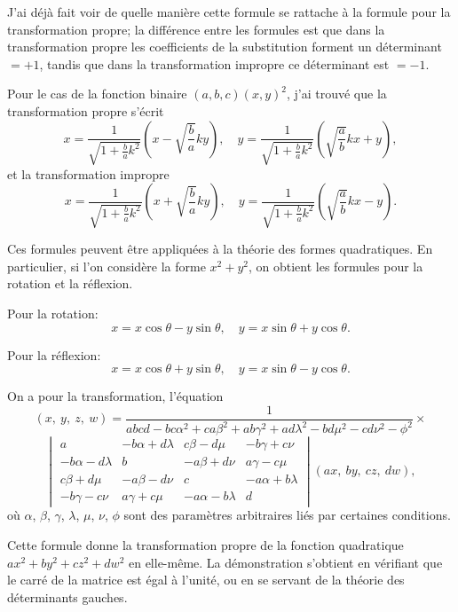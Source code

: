 \documentclass[12pt,a4paper]{article}
\begin{document}
\newpage
\setcounter{page}{212}

J'ai d\'{e}j\`{a} fait voir de quelle mani\`{e}re cette formule se rattache \`{a} la formule pour la transformation propre; la diff\'{e}rence entre les formules est que dans la transformation propre les coefficients de la substitution forment un d\'{e}terminant $= +1$, tandis que dans la transformation impropre ce d\'{e}terminant est $= -1$.

Pour le cas de la fonction binaire $(a, b, c)(x, y)^2$, j'ai trouv\'{e} que la transformation propre s'\'{e}crit
\[
x = \frac{1}{\sqrt{1 + \frac{b}{a}k^2}}(x - \sqrt{\frac{b}{a}}ky),\quad
y = \frac{1}{\sqrt{1 + \frac{b}{a}k^2}}(\sqrt{\frac{a}{b}}kx + y),
\]
et la transformation impropre
\[
x = \frac{1}{\sqrt{1 + \frac{b}{a}k^2}}(x + \sqrt{\frac{b}{a}}ky),\quad
y = \frac{1}{\sqrt{1 + \frac{b}{a}k^2}}(\sqrt{\frac{a}{b}}kx - y).
\]

Ces formules peuvent \^{e}tre appliqu\'{e}es \`{a} la th\'{e}orie des formes quadratiques. En particulier, si l'on consid\`{e}re la forme $x^2 + y^2$, on obtient les formules pour la rotation et la r\'{e}flexion.

Pour la rotation:
\[
x = x\cos\theta - y\sin\theta,\quad
y = x\sin\theta + y\cos\theta.
\]

Pour la r\'{e}flexion:
\[
x = x\cos\theta + y\sin\theta,\quad
y = x\sin\theta - y\cos\theta.
\]

\newpage
\setcounter{page}{213}

On a pour la transformation, l'\'{e}quation
\[
(x,\ y,\ z,\ w) =
\frac{1}{abcd - bc\alpha^2 + ca\beta^2 + ab\gamma^2 + ad\lambda^2 - bd\mu^2 - cd\nu^2 - \phi^2}
\times
\]
\[
\begin{vmatrix}
a & -b\alpha + d\lambda & c\beta - d\mu & -b\gamma + c\nu \\
-b\alpha - d\lambda & b & -a\beta + d\nu & a\gamma - c\mu \\
c\beta + d\mu & -a\beta - d\nu & c & -a\alpha + b\lambda \\
-b\gamma - c\nu & a\gamma + c\mu & -a\alpha - b\lambda & d
\end{vmatrix}
(ax,\ by,\ cz,\ dw),
\]
o\`{u} $\alpha$, $\beta$, $\gamma$, $\lambda$, $\mu$, $\nu$, $\phi$ sont des param\`{e}tres arbitraires li\'{e}s par certaines conditions.

\newpage
\setcounter{page}{214}

Cette formule donne la transformation propre de la fonction quadratique $ax^2 + by^2 + cz^2 + dw^2$ en elle-m\^{e}me. La d\'{e}monstration s'obtient en v\'{e}rifiant que le carr\'{e} de la matrice est \'{e}gal \`{a} l'unit\'{e}, ou en se servant de la th\'{e}orie des d\'{e}terminants gauches.
\end{document}
